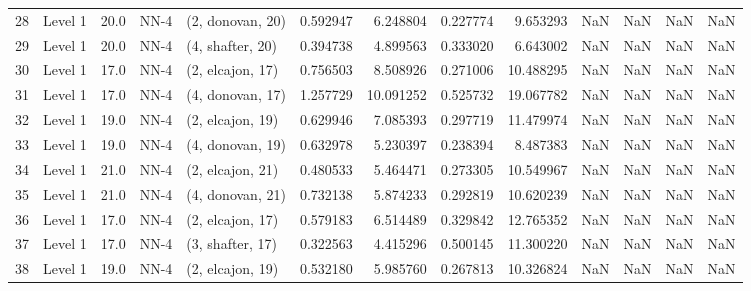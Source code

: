 \begin{tabular}{llrllrrrrrrrr}
28 &   Level 1 &   20.0 &        NN-4 &  (2, donovan, 20) &   0.592947 &   6.248804 &  0.227774 &   9.653293 &                  NaN &                    NaN &                 NaN &                   NaN \\
29 &   Level 1 &   20.0 &        NN-4 &  (4, shafter, 20) &   0.394738 &   4.899563 &  0.333020 &   6.643002 &                  NaN &                    NaN &                 NaN &                   NaN \\
30 &   Level 1 &   17.0 &        NN-4 &  (2, elcajon, 17) &   0.756503 &   8.508926 &  0.271006 &  10.488295 &                  NaN &                    NaN &                 NaN &                   NaN \\
31 &   Level 1 &   17.0 &        NN-4 &  (4, donovan, 17) &   1.257729 &  10.091252 &  0.525732 &  19.067782 &                  NaN &                    NaN &                 NaN &                   NaN \\
32 &   Level 1 &   19.0 &        NN-4 &  (2, elcajon, 19) &   0.629946 &   7.085393 &  0.297719 &  11.479974 &                  NaN &                    NaN &                 NaN &                   NaN \\
33 &   Level 1 &   19.0 &        NN-4 &  (4, donovan, 19) &   0.632978 &   5.230397 &  0.238394 &   8.487383 &                  NaN &                    NaN &                 NaN &                   NaN \\
34 &   Level 1 &   21.0 &        NN-4 &  (2, elcajon, 21) &   0.480533 &   5.464471 &  0.273305 &  10.549967 &                  NaN &                    NaN &                 NaN &                   NaN \\
35 &   Level 1 &   21.0 &        NN-4 &  (4, donovan, 21) &   0.732138 &   5.874233 &  0.292819 &  10.620239 &                  NaN &                    NaN &                 NaN &                   NaN \\
36 &   Level 1 &   17.0 &        NN-4 &  (2, elcajon, 17) &   0.579183 &   6.514489 &  0.329842 &  12.765352 &                  NaN &                    NaN &                 NaN &                   NaN \\
37 &   Level 1 &   17.0 &        NN-4 &  (3, shafter, 17) &   0.322563 &   4.415296 &  0.500145 &  11.300220 &                  NaN &                    NaN &                 NaN &                   NaN \\
38 &   Level 1 &   19.0 &        NN-4 &  (2, elcajon, 19) &   0.532180 &   5.985760 &  0.267813 &  10.326824 &                  NaN &                    NaN &                 NaN &                   NaN \\

\end{tabular}
